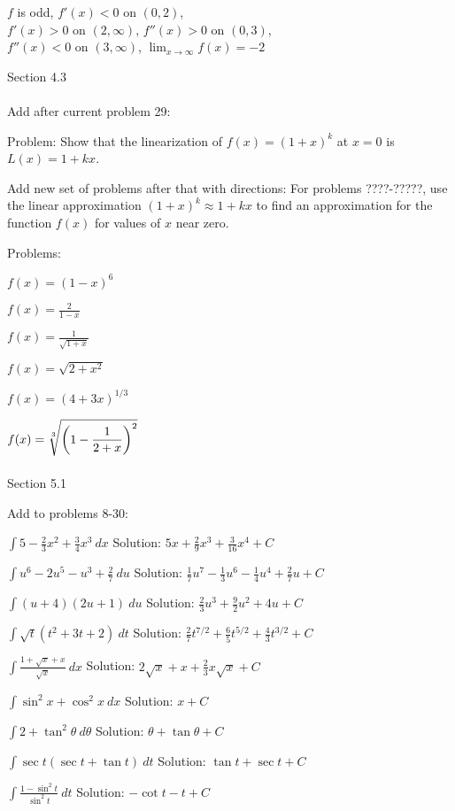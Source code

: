 \documentclass[10pt]{article}
\newcommand{\ds}{\displaystyle}
\begin{document}
$f$ is odd, $f'(x)<0$ on $(0,2)$,\\
$f'(x)>0$ on $(2,\infty)$, $f''(x)>0$ on $(0,3)$,\\
$f''(x)<0$ on $(3,\infty)$, $\ds \lim_{x\to\infty}f(x)=-2$


Section 4.3\\ \\

Add after current problem 29:

Problem: Show that the linearization of $f(x)=(1+x)^k$ at $x=0$ is $L(x)=1+kx$.

Add new set of problems after that with directions:
	For problems ????-?????, use the linear approximation $(1+x)^k\approx 1+kx$ to find an approximation for the function $f(x)$ for values of $x$ near zero.

Problems:

$f(x)=(1-x)^6$

$\ds f(x)=\frac{2}{1-x}$

$\ds f(x)=\frac{1}{\sqrt{1+x}}$

$f(x)=\sqrt{2+x^2}$

$f(x)=(4+3x)^{1/3}$

$\ds f(x)=\root 3 \of {\biggl(1-\frac{1}{2+x}\biggr)^2}$\\ \\


Section 5.1

Add to problems 8-30:   %

$\ds \int 5-\frac23 x^2+\frac34 x^3~dx$		Solution: $5x+\frac29 x^3+\frac{3}{16}x^4+C$

$\ds \int u^6-2u^5-u^3+\frac27 ~du$			Solution: $\frac17 u^7-\frac13 u^6-\frac14 u^4+\frac27 u+C$

$\ds \int (u+4)(2u+1)~du$				Solution: $\frac23 u^3+\frac92 u^2+4u+C$

$\ds \int \sqrt t(t^2+3t+2)~dt$				Solution: $\frac27 t^{7/2}+\frac65 t^{5/2}+\frac43 t^{3/2}+C$

$\ds \int \frac{1+\sqrt x +x}{\sqrt x}~dx$		Solution: $2\sqrt x+x+\frac23 x\sqrt x+C$

$\ds \int \sin^2 x+\cos^2 x ~dx$			Solution: $x+C$

$\ds \int 2+\tan^2 \theta ~d\theta$			Solution: $\theta+\tan \theta +C$

$\ds \int \sec t(\sec t+\tan t)~dt$			Solution: $\tan t+\sec t+C$

$\ds \int \frac{1-\sin^2 t}{\sin^2 t}~dt$		Solution: $-\cot t-t+C$
\end{document}
